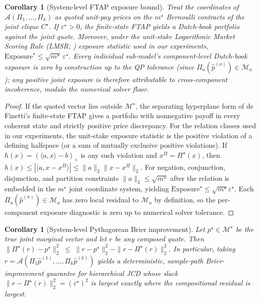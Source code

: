 \documentclass{article}
\theoremstyle{plain}
\newtheorem{corollary}[theorem]{Corollary}
\theoremstyle{definition}
\theoremstyle{remark}
\newcommand{\Mloc}{\mathcal{M}_a}
\newcommand{\Mjoint}{\mathcal{M}^{\star}}
\newcommand{\Pijoint}{\Pi^{\star}}
\newcommand{\Aagg}{\mathcal{A}}
\newcommand{\hpK}{\hat p}
\newcommand{\eps}{\varepsilon}
\begin{document}
\begin{corollary}[System-level FTAP exposure bound]
\label{cor:syslmsr}
Treat the coordinates of $\Aagg(\Pi_1,\dots,\Pi_k)$ as quoted
unit-pay prices on the $m^\star$ Bernoulli contracts of the joint
clique $C^\star$. If $\eps^\star>0$, the finite-state FTAP yields
a Dutch-book portfolio against the joint quote. Moreover, under the unit-stake
Logarithmic Market Scoring Rule (LMSR;
\citealp{hanson2003combinatorial}) exposure statistic used in our
experiments,
\(
\mathrm{Exposure}^\star \le \sqrt{m^\star}\,\eps^\star.
\)
Every individual sub-model's component-level Dutch-book exposure
is zero by construction up to the QP tolerance (since
$\Pi_a(\hpK^{(a)}) \in \Mloc$); any positive joint exposure
is therefore attributable to cross-component incoherence, modulo
the numerical solver floor.
\end{corollary}

\begin{proof}
If the quoted vector lies outside $\Mjoint$, the separating
hyperplane form of de Finetti's finite-state FTAP gives a
portfolio with nonnegative payoff in every coherent state and
strictly positive price discrepancy. For the relation classes used
in our experiments, the unit-stake exposure statistic is the
positive violation of a defining halfspace (or a sum of mutually
exclusive positive violations). If
$h(x)=(\langle a,x\rangle-b)_+$ is any such violation and
$x^\Pi=\Pijoint(x)$, then
$h(x)\le |\langle a,x-x^\Pi\rangle|\le \|a\|_2\|x-x^\Pi\|_2$.
For negation, conjunction, disjunction, and partition constraints
$\|a\|_2\le \sqrt{m^\star}$ after the relation is embedded in the
$m^\star$ joint coordinate system, yielding
$\mathrm{Exposure}^\star \le \sqrt{m^\star}\eps^\star$. Each
$\Pi_a(\hpK^{(a)}) \in \Mloc$ has zero local residual to $\Mloc$
by definition, so the per-component exposure diagnostic is zero up
to numerical solver tolerance.
\end{proof}

\begin{corollary}[System-level Pythagorean Brier improvement]
\label{cor:sysbrier}
Let $p^\star \in \Mjoint$ be the true joint marginal vector and
let $r$ be any composed quote. Then
\(
\|\Pijoint(r) - p^\star\|_2^2 \;\le\; \|r - p^\star\|_2^2
- \|r - \Pijoint(r)\|_2^2.
\)
In particular, taking
$r = \Aagg(\Pi_1\hpK^{(1)},\dots,\Pi_k\hpK^{(k)})$ yields a
deterministic, sample-path Brier-improvement guarantee for
hierarchical JCD whose slack
$\|r-\Pijoint(r)\|_2^2 = (\eps^\star)^2$ is largest exactly where
the compositional residual is largest.
\end{corollary}
\end{document}
